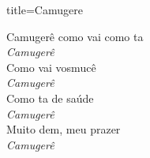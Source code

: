 \documentclass[fontsize=14pt, paper=a4, twoside, DIV=20]{scrreprt} %
\begin{document}
\begin{multicols*}{2}
\begin{song}{title={Camugere}}
        \begin{verse*}
            Camugerê como vai como ta\\
            \textit{Camugerê}\\
            Como vai vosmucê\\
            \textit{Camugerê}\\
            Como ta de saúde\\
            \textit{Camugerê}\\
            Muito dem, meu prazer\\
            \textit{Camugerê}\\
        \end{verse*}
\end{song}




\end{multicols*}
\end{document}
